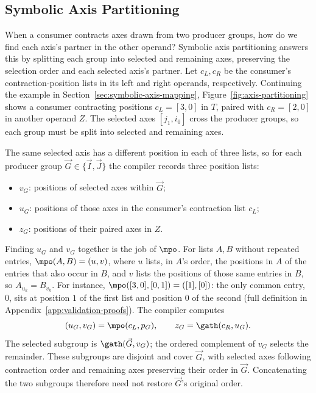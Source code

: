 \subsection{Symbolic Axis Partitioning}
\label{sec:symbolic-axis-partitioning}
When a consumer contracts axes drawn from two producer groups, how do we find
each axis's partner in the other operand? Symbolic axis partitioning answers
this by splitting each group into selected and remaining axes, preserving the
selection order and each selected axis's partner.
Let $c_L,c_R$ be the consumer's contraction-position lists in its left
and right operands, respectively. Continuing the example in
Section~\ref{sec:symbolic-axis-mapping},
Figure~\ref{fig:axis-partitioning} shows a consumer contracting positions $c_L=[3,0]$ in $T$, paired
with $c_R=[2,0]$ in another operand $Z$. The selected axes $[j_1,i_0]$
cross the producer groups, so each group must be split into selected and
remaining axes.


The same selected axis has a different position in each of three lists, so
for each producer group $\vec G\in\{\vec I,\vec J\}$ the compiler records
three position lists:
\begin{itemize}
\item $v_G$: positions of selected axes within $\vec G$;
\item $u_G$: positions of those axes in the consumer's contraction list $c_L$;
\item $z_G$: positions of their paired axes in $Z$.
\end{itemize}
Finding $u_G$ and $v_G$ together is the job of $\mpo$. For lists $A,B$ without
repeated entries, $\mpo(A,B)=(u,v)$, where $u$ lists, in $A$'s order, the
positions in $A$ of the entries that also occur in $B$, and $v$ lists the
positions of those same entries in $B$, so $A_{u_k}=B_{v_k}$. For instance,
$\mpo([3,0],[0,1])=([1],[0])$: the only common entry, $0$, sits at position
$1$ of the first list and position $0$ of the second (full definition in
Appendix~\ref{app:validation-proofs}).
The compiler computes
\begin{equation}
 (u_G,v_G)=\mpo(c_L,p_G),\qquad z_G=\gath(c_R,u_G).
 \label{eq:symbolic-partition-selectors}
\end{equation}
The selected subgroup is $\gath(\vec G,v_G)$; the ordered complement of
$v_G$ selects the remainder. These subgroups are disjoint and cover $\vec G$,
with selected axes following contraction order and remaining axes preserving
their order in $\vec G$. Concatenating the two subgroups therefore need not
restore $\vec G$'s original order.

